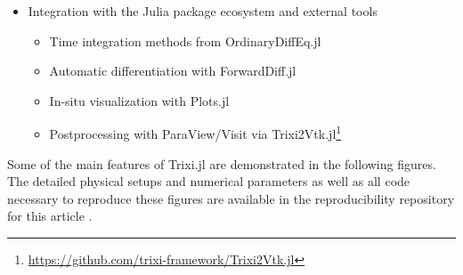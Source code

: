 \documentclass{juliacon}
\newcommand{\trixi}{Trixi.jl\xspace}
\begin{document}
\begin{itemize}
  \item Integration with the Julia package ecosystem and external tools
  \begin{itemize}
    \item Time integration methods from OrdinaryDiffEq.jl
    \item Automatic differentiation with ForwardDiff.jl
    \item In-situ visualization with Plots.jl
    \item Postprocessing with ParaView/Visit via Trixi2Vtk.jl\footnote{\url{https://github.com/trixi-framework/Trixi2Vtk.jl}}
  \end{itemize}
\end{itemize}

Some of the main features of \trixi are demonstrated in the following figures.
The detailed physical setups and numerical parameters as well as all code
necessary to reproduce these figures are available in the reproducibility
repository for this article \cite{ranocha2021adaptiveRepro}.
\end{document}
